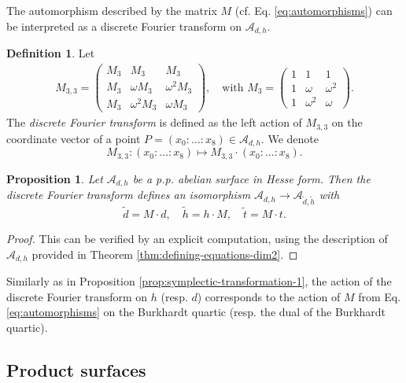 \documentclass[11pt]{amsart}
\newtheorem{proposition}[theorem]{Proposition}
\theoremstyle{definition}
\newtheorem{definition}[theorem]{Definition}
\newcommand{\A}{\mathcal{A}}
\begin{document}
	
	The automorphism described by the matrix $M$ (cf. Eq. \ref{eq:automorphisms}) can be interpreted as a discrete Fourier transform on $\A_{d,h}$. 
	
	\begin{definition} \label{def:DFT}
		Let 
		\begin{align*}
			 M_{3,3} =  \begin{pmatrix}
				M_3 & M_3 & M_3\\
				M_3 & \omega M_3 & \omega^2 M_3\\
				M_3 & \omega^2 M_3 & \omega M_3
			\end{pmatrix}, \quad \text{with }
			M_3 =  \begin{pmatrix}
				1 & 1 & 1\\
				1 & \omega & \omega^2 \\
				1 & \omega^2  & \omega 
			\end{pmatrix}.
		\end{align*}
		The {\em discrete Fourier transform} is defined as the left action of $M_{3,3}$ on the coordinate vector of a point $P =(x_0:\dots:x_8) \in \A_{d,h}$. We denote
		\[
		M_{3,3}: (x_0:\dots:x_8) \mapsto {M_{3,3}} \cdot (x_0: \dots: x_8).
		\]  
\end{definition}
	
\begin{proposition}\label{prop:dual-coordinates-dim2}
		Let $\A_{d,h}$ be a p.p. abelian surface in Hesse form. Then the discrete Fourier transform  defines an isomorphism $\A_{d, h} \to \A_{\tilde d,\tilde h}$ with
		\[
		\tilde d = M\cdot d, \quad {\tilde h} = h \cdot M,\quad \tilde t = M \cdot t.
		\]
\end{proposition}
	
\begin{proof}
	This can be verified by an explicit computation, using the description of $\A_{d,h}$ provided in Theorem \ref{thm:defining-equations-dim2}.	
\end{proof}
	
Similarly as in Proposition \ref{prop:symplectic-transformation-1}, the action of the discrete Fourier transform on $h$ (resp. $d$) corresponds to the action of $M$ from Eq. \ref{eq:automorphisms} on the Burkhardt quartic (resp. the dual of the Burkhardt quartic).

\subsection{Product surfaces}\label{subsec:product}
\end{document}
